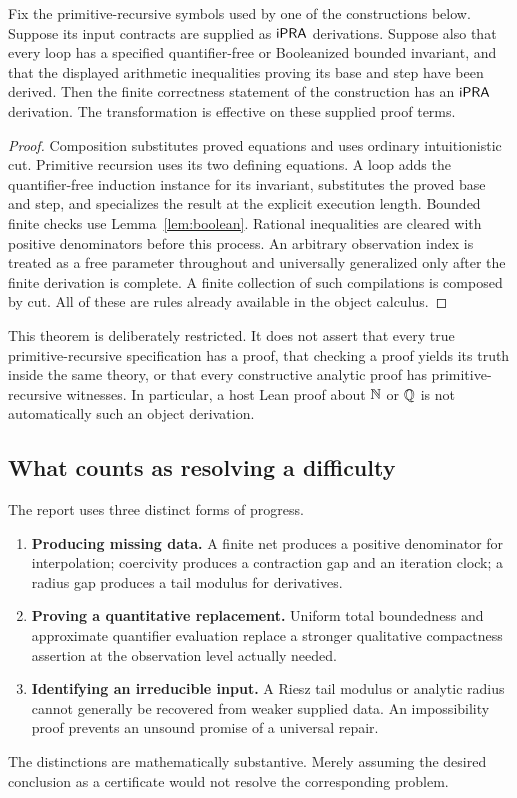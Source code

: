 \begin{theorem}
\label{thm:compilation}
Fix the primitive-recursive symbols used by one of the constructions below.
Suppose its input contracts are supplied as \(\mathsf{iPRA}\) derivations. Suppose
also that every loop has a specified quantifier-free or Booleanized bounded
invariant, and that the displayed arithmetic inequalities proving its base
and step have been derived. Then the finite correctness statement of the
construction has an \(\mathsf{iPRA}\) derivation. The transformation is effective
on these supplied proof terms.
\end{theorem}
\begin{proof}
Composition substitutes proved equations and uses ordinary intuitionistic
cut. Primitive recursion uses its two defining equations. A loop adds the
quantifier-free induction instance for its invariant, substitutes the proved
base and step, and specializes the result at the explicit execution length.
Bounded finite checks use Lemma~\ref{lem:boolean}. Rational inequalities are
cleared with positive denominators before this process. An arbitrary
observation index is treated as a free parameter throughout and universally
generalized only after the finite derivation is complete. A finite collection
of such compilations is composed by cut. All of these are rules already
available in the object calculus.
\end{proof}

This theorem is deliberately restricted. It does not assert that every true
primitive-recursive specification has a proof, that checking a proof yields
its truth inside the same theory, or that every constructive analytic proof
has primitive-recursive witnesses. In particular, a host Lean proof about
\(\mathbb N\) or \(\mathbb Q\) is not automatically such an object derivation.

\subsection{What counts as resolving a difficulty}

The report uses three distinct forms of progress.
\begin{enumerate}
\item \textbf{Producing missing data.} A finite net produces a positive
denominator for interpolation; coercivity produces a contraction gap and
an iteration clock; a radius gap produces a tail modulus for derivatives.
\item \textbf{Proving a quantitative replacement.} Uniform total boundedness
and approximate quantifier evaluation replace a stronger qualitative
compactness assertion at the observation level actually needed.
\item \textbf{Identifying an irreducible input.} A Riesz tail modulus or
analytic radius cannot generally be recovered from weaker supplied data.
An impossibility proof prevents an unsound promise of a universal repair.
\end{enumerate}
The distinctions are mathematically substantive. Merely assuming the desired
conclusion as a certificate would not resolve the corresponding problem.
